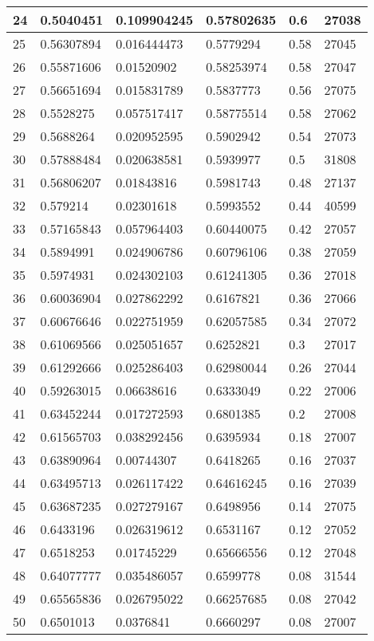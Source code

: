 \begin{longtable}{|l|l|l|l|l|l|}
24 & 0.5040451 & 0.109904245 & 0.57802635 & 0.6 & 27038 \\ \hline 
25 & 0.56307894 & 0.016444473 & 0.5779294 & 0.58 & 27045 \\ \hline 
26 & 0.55871606 & 0.01520902 & 0.58253974 & 0.58 & 27047 \\ \hline 
27 & 0.56651694 & 0.015831789 & 0.5837773 & 0.56 & 27075 \\ \hline 
28 & 0.5528275 & 0.057517417 & 0.58775514 & 0.58 & 27062 \\ \hline 
29 & 0.5688264 & 0.020952595 & 0.5902942 & 0.54 & 27073 \\ \hline 
30 & 0.57888484 & 0.020638581 & 0.5939977 & 0.5 & 31808 \\ \hline 
31 & 0.56806207 & 0.01843816 & 0.5981743 & 0.48 & 27137 \\ \hline 
32 & 0.579214 & 0.02301618 & 0.5993552 & 0.44 & 40599 \\ \hline 
33 & 0.57165843 & 0.057964403 & 0.60440075 & 0.42 & 27057 \\ \hline 
34 & 0.5894991 & 0.024906786 & 0.60796106 & 0.38 & 27059 \\ \hline 
35 & 0.5974931 & 0.024302103 & 0.61241305 & 0.36 & 27018 \\ \hline 
36 & 0.60036904 & 0.027862292 & 0.6167821 & 0.36 & 27066 \\ \hline 
37 & 0.60676646 & 0.022751959 & 0.62057585 & 0.34 & 27072 \\ \hline 
38 & 0.61069566 & 0.025051657 & 0.6252821 & 0.3 & 27017 \\ \hline 
39 & 0.61292666 & 0.025286403 & 0.62980044 & 0.26 & 27044 \\ \hline 
40 & 0.59263015 & 0.06638616 & 0.6333049 & 0.22 & 27006 \\ \hline 
41 & 0.63452244 & 0.017272593 & 0.6801385 & 0.2 & 27008 \\ \hline 
42 & 0.61565703 & 0.038292456 & 0.6395934 & 0.18 & 27007 \\ \hline 
43 & 0.63890964 & 0.00744307 & 0.6418265 & 0.16 & 27037 \\ \hline 
44 & 0.63495713 & 0.026117422 & 0.64616245 & 0.16 & 27039 \\ \hline 
45 & 0.63687235 & 0.027279167 & 0.6498956 & 0.14 & 27075 \\ \hline 
46 & 0.6433196 & 0.026319612 & 0.6531167 & 0.12 & 27052 \\ \hline 
47 & 0.6518253 & 0.01745229 & 0.65666556 & 0.12 & 27048 \\ \hline 
48 & 0.64077777 & 0.035486057 & 0.6599778 & 0.08 & 31544 \\ \hline 
49 & 0.65565836 & 0.026795022 & 0.66257685 & 0.08 & 27042 \\ \hline 
50 & 0.6501013 & 0.0376841 & 0.6660297 & 0.08 & 27007 \\ \hline 
\end{longtable}